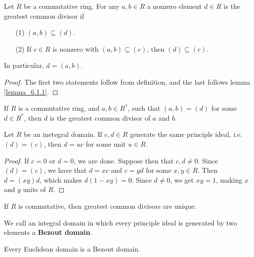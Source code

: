 \begin{lemma}\label{lemma_6.1.2}
  Let $R$ be a commutative ring. For any $a,b \in R$ a nonzero element  $d \in
  R$ is the greatest common divisor if
  \begin{enumerate}
    \item[(1)] $(a,b) \subseteq (d)$.

    \item[(2)] If $c \in R$ is nonzero with $(a,b) \subseteq (c)$, then $(d)
      \subseteq (c)$.
  \end{enumerate}
  In particular, $d=(a,b)$.
\end{lemma}
\begin{proof}
  The first two statements follow from definition, and the last follows lemma
  \ref{lemma_6.1.1}.
\end{proof}

\begin{lemma}\label{lemma_6.1.3}
  If $R$ is a commutative ring, and $a,b \in R^\ast$, such that  $(a,b)=(d)$
  for some $d \in R^\ast$, then $d$ is the greatest common divisor of $a$ and
  $b$.
\end{lemma}

\begin{lemma}\label{lemma_6.1.4}
  Let $R$ be an inetegral domain. If $c,d \in R$ generate the same principle
  ideal, i.e. $(d)=(c)$, then $d=uc$ for some unit  $u \in R$.
\end{lemma}
\begin{proof}
  If $c=0$ or  $d=0$, we are done. Suppose then that  $c,d \neq 0$. Since
  $(d)=(c)$, we have that $d=xc$ and $c=yd$ for some  $x,y \in R$. Then
  $d=(xy)d$, which makes $d(1-xy)=0$. Since $d \neq 0$, we get $xy=1$, making
  $x$ and $y$ units of $R$.
\end{proof}
\begin{corollary}
  If $R$ is commutative, then greatest common divisors are unique.
\end{corollary}

\begin{definition}
  We call an integral domain in which every principle ideal is generated by
  two elements a \textbf{Bezout domain}.
\end{definition}

\begin{lemma}\label{lemma_6.1.5}
  Every Euclidean domain is a Bezout domain.
\end{lemma}

